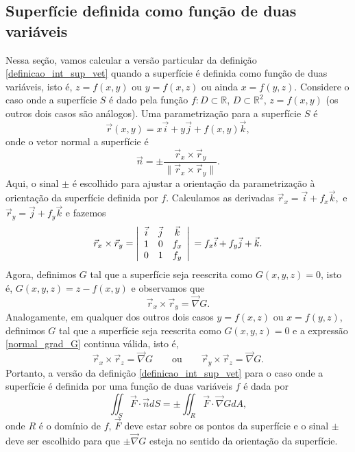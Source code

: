 \subsection{Superfície definida como função de duas variáveis}
Nessa seção, vamos calcular a versão particular da definição \eqref{definicao_int_sup_vet} quando a superfície é definida como função de duas variáveis, isto é, $z=f(x,y)$ ou $y=f(x,z)$ ou ainda $x=f(y,z)$. Considere o caso onde a superfície $S$ é dado pela função $f:D\subset\mathbb{R}$, $D\subset \mathbb{R}^2$, $z=f(x,y)$ (os outros dois casos são análogos). Uma parametrização para a superfície $S$ é
$$
\vec{r}(x,y)= x\vec{i}+ y\vec{j}+ f(x,y)\vec{k},
$$
onde o vetor normal a superfície é
$$
\vec{n}=\pm\frac{\vec{r}_x\times \vec{r}_y}{\|\vec{r}_x\times \vec{r}_y\|}.
$$
Aqui, o sinal $\pm$ é escolhido para ajustar a orientação da parametrização à orientação da superfície definida por $f$. Calculamos as derivadas $\vec{r}_x=\vec{i}+ f_x\vec{k},$ e $\vec{r}_y=\vec{j}+ f_y\vec{k}$ e fazemos
$$
  \vec{r}_x\times\vec{r}_y=\left|
 \begin{array}{ccc}
 \vec{i} & \vec{j} & \vec{k} \\
  1 &0 & f_x \\
0 &  1 & f_y
 \end{array}
\right|\\= f_x\vec{i}+ f_y\vec{j}+\vec{k}.
$$
Agora, definimos $G$ tal que a superfície seja reescrita como $G(x,y,z)=0$, isto é, $G(x,y,z)=z-f(x,y)$ e observamos que
\begin{equation}\label{normal_grad_G}
   \vec{r}_x\times\vec{r}_y=\vec{ \nabla} G.
\end{equation}
Analogamente, em qualquer dos outros dois casos $y=f(x,z)$ ou $x=f(y,z)$, definimos $G$ tal que a superfície seja reescrita como $G(x,y,z)=0$ e a expressão \eqref{normal_grad_G} continua válida, isto é,
\begin{equation*}\label{normal_grad_G_2}
   \vec{r}_x\times\vec{r}_z=\vec{ \nabla} G\qquad \text{ou} \qquad    \vec{r}_y\times\vec{r}_z=\vec{ \nabla} G.
\end{equation*}
Portanto, a versão da definição \eqref{definicao_int_sup_vet} para o caso onde a superfície é definida por uma função de duas variáveis $f$ é dada por
\begin{equation}\label{definicao_int_sup_vet_par}
\iint_S \vec{F}\cdot \vec{n} d S= \pm \iint_R \vec{F}\cdot \vec{\nabla}G dA,
\end{equation}
onde $R$ é o domínio de $f$, $\vec{F}$ deve estar sobre os pontos da superfície e o sinal $\pm$ deve ser escolhido para que $\pm \vec{\nabla}G$ esteja no sentido da orientação da superfície.


